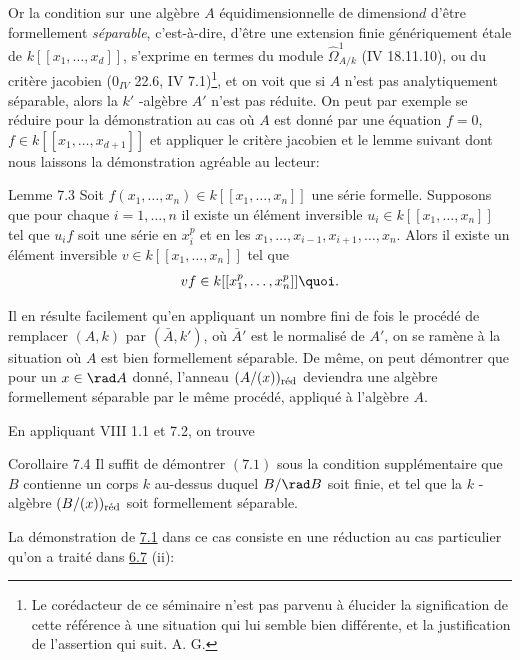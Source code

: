 \documentclass[10pt]{../fichiers-configuration-latex/smfart}
\begin{document}
Or la condition sur une algèbre $A$ équidimensionnelle de
dimension\pageoriginale $d$ d'être formellement \emph{séparable},
c'est-à-dire, d'être une extension finie génériquement étale de
$k[[x_{1},\ldots, x_{d}]]$, s'exprime en termes du module
$\widehat{\Omega}^{1}_{A/k}$ (\EGA IV 18.11.10), ou du critère
jacobien (\EGA $0_{IV}$ 22.6, IV 7.1)\footnote[1]{Le corédacteur de ce
séminaire n'est pas parvenu à élucider la signification de cette
référence à une situation qui lui semble bien différente, et la
justification de l'assertion qui suit. A. G.}, et on voit que si $A$
n'est pas analytiquement séparable, alors la $k'$ -algèbre $A'$ n'est
pas réduite. On peut par exemple se réduire pour la démonstration au
cas où $A$ est donné par une équation $f=0$, $f\in k[[x_{1},\ldots,
x_{d+1}]]$ et appliquer le critère jacobien et le lemme suivant dont
nous laissons la démonstration agréable au lecteur:

\begin{enonce*}{Lemme 7.3}
Soit $f(x_{1},\ldots,x_{n})\in k[[x_{1},\ldots,x_{n}]]$ une série
formelle. Supposons que pour chaque $i=1,\ldots,n$ il existe un
élément inversible $u_{i}\in k[[x_{1},\ldots,x_{n}]]$ tel que $u_{i}f$
soit une série en $x_{i}^{p}$ et en les
$x_{1},\ldots,x_{i-1},x_{i+1},\ldots,x_{n}$. Alors il existe un
élément inversible $v\in k[[x_{1},\ldots,x_{n}]]$ tel que
$$
vf\in k[[x_{1}^{p},\ldots,x_{n}^{p}]]{\quoi}.
$$
\end{enonce*}

Il en résulte facilement qu'en appliquant un nombre fini de fois le
procédé de remplacer $(A,k)$ par $(\bar{A},k')$, où $\bar{A}'$ est le
normalisé de $A'$, on se ramène à la situation où $A$ est bien
formellement séparable. De même, on peut démontrer que pour un $x\in
\rad A$ donné, l'anneau $(A/(x))_{\text{\rm réd}}$ deviendra une
algèbre formellement séparable par le même procédé, appliqué à
l'algèbre $A$.

En appliquant VIII 1.1 et 7.2, on trouve

\begin{enonce*}{Corollaire 7.4}
Il suffit de démontrer $(7.1)$ sous la condition supplémentaire que
$B$ contienne un corps $k$ au-dessus duquel $B/\rad B$ soit finie, et
tel que la $k$ -algèbre $(B/(x))_{\text{\rm réd}}$ soit formellement
séparable.\pageoriginale
\end{enonce*}
 
La démonstration de \hyperref[XIX.lem7.1]{7.1} dans ce cas consiste en une
réduction au cas 
particulier qu'on a traité dans \hyperref[XIX.lem6.7]{6.7}  (ii):
\end{document}
